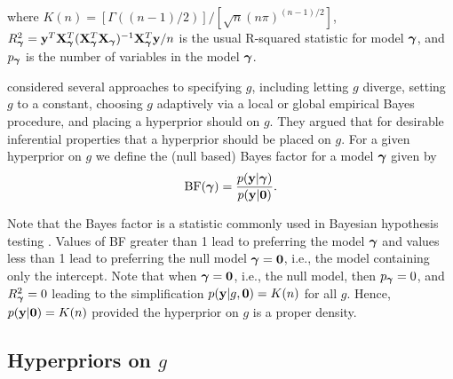 \noindent where $K(n) = [\Gamma( (n-1)/2 )]/[\sqrt{n}(n\pi)^{(n-1)/2}]$, 
$R_{\boldsymbol \gamma}^2 = {\bf y}^T{\bf X}_{\boldsymbol \gamma}^T({\bf X}_{\boldsymbol \gamma}^T{\bf X}_{\boldsymbol \gamma})^{-1}{\bf X}_{\boldsymbol \gamma}^T{\bf y}/n$ is 
the usual R-squared statistic for model ${\boldsymbol \gamma}$, and $p_{\boldsymbol \gamma}$ is the number
of variables in the model ${\boldsymbol \gamma}$.


\cite{Liang2008} considered several approaches to specifying $g$, including letting $g$ diverge,
setting $g$ to a constant, choosing $g$ adaptively via a local or global empirical Bayes procedure,
and placing a hyperprior should  on $g$. They argued that for desirable inferential properties that a  hyperprior 
should be placed on $g$.
For a given hyperprior on $g$ we define the (null based) Bayes factor for a model ${\boldsymbol \gamma}$ given by
$$
\displaystyle \mbox{BF}({\boldsymbol \gamma}) = \frac{p({\bf y}|{\boldsymbol \gamma})}{p({\bf y}|{\bf 0})}.
$$

\noindent Note that the Bayes factor is a statistic commonly used in Bayesian hypothesis testing
\citep{Raftery1997,OrmerodEtal2017}.
Values of BF greater than 1 lead to preferring the model ${\boldsymbol \gamma}$ and values
less than 1 lead to preferring the null model ${\boldsymbol \gamma}={\bf 0}$, i.e., the model containing only
the intercept. Note that
when ${\boldsymbol \gamma} = {\bf 0}$, i.e., the null model, then $p_{\boldsymbol \gamma} = 0$, and
$R_{\boldsymbol \gamma}^2 = 0$ leading to the simplification $p({\bf y}|g,{\bf 0}) = K(n)$
for all $g$. Hence, $p({\bf y}|{\bf 0}) = K(n)$ provided the hyperprior on $g$ is a proper density.  

\subsection{Hyperpriors on $g$}


